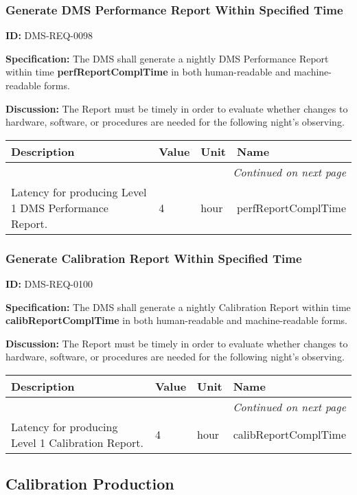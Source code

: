 \documentclass[SE,toc,lsstdraft]{lsstdoc}
\makeatletter
\newcommand{\paramname}[1]{\hspace{0pt}#1}
\newcommand{\unitname}[1]{\hspace{0pt}#1}
\newenvironment{parameters}[0]{%
\setlength\LTleft{0pt}
\setlength\LTright{\fill}
\begin{small}
\begin{longtable}[]{|p{0.5\textwidth}|l|p{0.6in}|p{1.74in}@{}|}

\hline \textbf{Description} & \textbf{Value} & \textbf{Unit} & \textbf{Name} \\ \hline
\endhead

\hline \multicolumn{4}{r}{\emph{Continued on next page}} \\
\endfoot

\hline\hline
\endlastfoot
}{%
\hline
\end{longtable}
\end{small}
}
\makeatother
\begin{document}
\subsubsection{Generate DMS Performance Report Within Specified Time}

\label{DMS-REQ-0098}
\textbf{ID:} DMS-REQ-0098

\textbf{Specification:} The DMS shall generate a nightly DMS Performance Report within time \textbf{perfReportComplTime }in both human-readable and machine-readable forms.

\textbf{Discussion:} The Report must be timely in order to evaluate whether changes to hardware, software, or procedures are needed for the following night's observing.



\begin{parameters}
Latency for producing Level 1 DMS Performance Report.
&
4
&
\unitname{%
hour
}
&
\paramname{%
perfReportComplTime
} \\\hline
\end{parameters}




\subsubsection{Generate Calibration Report Within Specified Time}

\label{DMS-REQ-0100}
\textbf{ID:} DMS-REQ-0100

\textbf{Specification:} The DMS shall generate a nightly Calibration Report within time \textbf{calibReportComplTime }in both human-readable and machine-readable forms.

\textbf{Discussion:} The Report must be timely in order to evaluate whether changes to hardware, software, or procedures are needed for the following night's observing.



\begin{parameters}
Latency for producing Level 1 Calibration Report.
&
4
&
\unitname{%
hour
}
&
\paramname{%
calibReportComplTime
} \\\hline
\end{parameters}




\subsection{Calibration Production}
\end{document}
